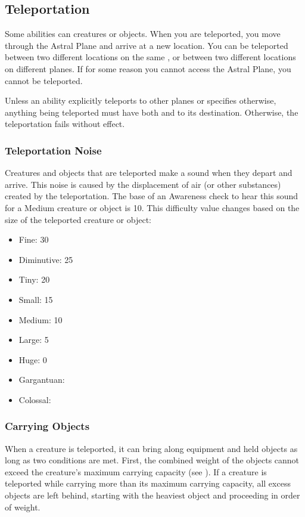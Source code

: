     \subsection{Teleportation}\label{Teleportation}
        Some abilities can  creatures or objects.
        When you are teleported, you move through the Astral Plane and arrive at a new location.
        You can be teleported between two different locations on the same , or between two different locations on different planes.
        If for some reason you cannot access the Astral Plane, you cannot be teleported.

        Unless an ability explicitly teleports to other planes or specifies otherwise, anything being teleported must have both  and  to its destination.
        Otherwise, the teleportation fails without effect.

        \subsubsection{Teleportation Noise}\label{Teleportation Noise}
            Creatures and objects that are teleported make a sound when they depart and arrive.
            This noise is caused by the displacement of air (or other substances) created by the teleportation.
            The base  of an Awareness check to hear this sound for a Medium creature or object is 10.
            This difficulty value changes based on the size of the teleported creature or object:

            \begin{itemize}
                \item Fine: 30
                \item Diminutive: 25
                \item Tiny: 20
                \item Small: 15
                \item Medium: 10
                \item Large: 5
                \item Huge: 0
                \item Gargantuan: 
                \item Colossal: 
            \end{itemize}

        \subsubsection{Carrying Objects}
            When a creature is teleported, it can bring along equipment and held objects as long as two conditions are met.
            First, the combined weight of the objects cannot exceed the creature's maximum carrying capacity (see ).
            If a creature is teleported while carrying more than its maximum carrying capacity, all excess objects are left behind, starting with the heaviest object and proceeding in order of weight.

